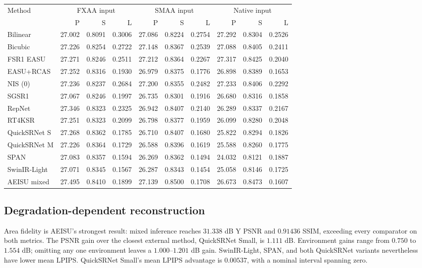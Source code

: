 \documentclass[10pt,twocolumn,letterpaper]{article}
\newcommand{\model}{AEISU}
\begin{document}
\begin{table}[t]
\begin{tabular}{l*{9}{r}}
\toprule
Method & \multicolumn{3}{c}{FXAA input} & \multicolumn{3}{c}{SMAA input} & \multicolumn{3}{c}{Native input}\\
\cmidrule(lr){2-4}\cmidrule(lr){5-7}\cmidrule(lr){8-10}
 & P & S & L & P & S & L & P & S & L\\
\midrule
Bilinear & 27.002 & 0.8091 & 0.3006 & 27.086 & 0.8224 & 0.2754 & 27.292 & 0.8304 & 0.2526 \\
Bicubic & 27.226 & 0.8254 & 0.2722 & 27.148 & 0.8367 & 0.2539 & 27.088 & 0.8405 & 0.2411 \\
FSR1 EASU & 27.271 & 0.8246 & 0.2511 & 27.212 & 0.8364 & 0.2267 & 27.317 & 0.8425 & 0.2040 \\
EASU+RCAS & 27.252 & 0.8316 & 0.1930 & 26.979 & 0.8375 & 0.1776 & 26.898 & 0.8389 & 0.1653 \\
NIS (0) & 27.236 & 0.8237 & 0.2684 & 27.200 & 0.8355 & 0.2482 & 27.233 & 0.8406 & 0.2292 \\
SGSR1 & 27.067 & 0.8246 & 0.1997 & 26.735 & 0.8301 & 0.1916 & 26.680 & 0.8316 & 0.1858 \\
RepNet & 27.346 & 0.8323 & 0.2325 & 26.942 & 0.8407 & 0.2140 & 26.289 & 0.8337 & 0.2167 \\
RT4KSR & 27.251 & 0.8323 & 0.2099 & 26.798 & 0.8377 & 0.1959 & 26.099 & 0.8280 & 0.2048 \\
QuickSRNet S & 27.268 & 0.8362 & 0.1785 & 26.710 & 0.8407 & 0.1680 & 25.822 & 0.8294 & 0.1826 \\
QuickSRNet M & 27.226 & 0.8364 & 0.1729 & 26.588 & 0.8396 & 0.1619 & 25.588 & 0.8260 & 0.1775 \\
SPAN & 27.083 & 0.8357 & 0.1594 & 26.269 & 0.8362 & 0.1494 & 24.032 & 0.8121 & 0.1887 \\
SwinIR-Light & 27.071 & 0.8345 & 0.1567 & 26.287 & 0.8343 & 0.1454 & 25.058 & 0.8146 & 0.1725 \\
\midrule
\model{} mixed & 27.495 & 0.8410 & 0.1899 & 27.139 & 0.8500 & 0.1708 & 26.673 & 0.8473 & 0.1607 \\
\bottomrule
\end{tabular}
\endgroup
\end{table}

\subsection{Degradation-dependent reconstruction}
Area fidelity is \model{}'s strongest result: mixed inference reaches $31.338$ dB Y PSNR and $0.91436$ SSIM, exceeding every comparator on both metrics.
The PSNR gain over the closest external method, QuickSRNet Small, is $1.111$ dB.
Environment gains range from $0.750$ to $1.554$ dB; omitting any one environment leaves a $1.000$--$1.201$ dB gain.
SwinIR-Light, SPAN, and both QuickSRNet variants nevertheless have lower mean LPIPS.
QuickSRNet Small's mean LPIPS advantage is $0.00537$, with a nominal interval spanning zero.
\end{document}
